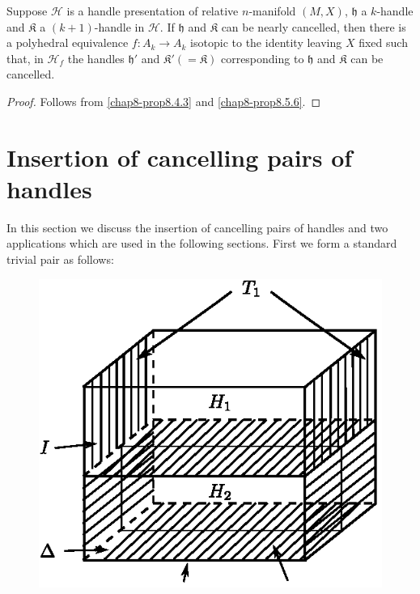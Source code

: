 \begin{proposition}\label{chap8-prop8.5.7}
Suppose $\mathscr{H}$ is a handle presentation of relative $n$-manifold $(M,X)$, $\mathfrak{h}$ a $k$-handle and $\mathfrak{K}$ a $(k+1)$-handle in $\mathscr{H}$. If $\mathfrak{h}$ and $\mathfrak{K}$ can be nearly cancelled, then there is a polyhedral equivalence $f:A_{k}\to A_{k}$ isotopic to the identity leaving $X$ fixed such that, in $\mathscr{H}_{f}$ the handles $\mathfrak{h}'$ and $\mathfrak{K}'(=\mathfrak{K})$ corresponding to $\mathfrak{h}$ and $\mathfrak{K}$ can be cancelled.
\end{proposition}

\begin{proof}
Follows from \ref{chap8-prop8.4.3} and \ref{chap8-prop8.5.6}.
\end{proof}

\section{Insertion of cancelling pairs of handles}\label{chap8-sec8.6}\pageoriginale

In this section we discuss the insertion of cancelling pairs of handles and two applications which are used in the following sections. First we form a standard trivial pair as follows:
\begin{figure}[H]
\centering
\includegraphics{figure/fig26.eps}
\end{figure}


